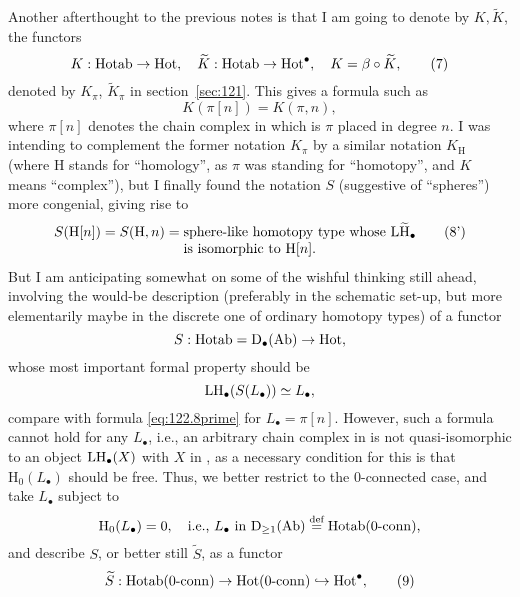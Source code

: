 Another afterthought to the previous notes is that I am going to
denote by $K, \widetilde K$, the functors
\begin{equation}
  \label{eq:122.7bis}
  K:\operatorname{Hotab}\to\operatorname{Hot}, \quad
  \widetilde K:\operatorname{Hotab}\to\operatorname{Hot}^\bullet, \quad
  K=\beta\circ\widetilde K,\tag{7}
\end{equation}
denoted by $K_\pi$, $\widetilde K_\pi$ in section~\ref{sec:121}. This
gives a formula such as
\begin{equation}
  \label{eq:122.8}
  K(\pi[n]) = K(\pi,n),\tag{8}
\end{equation}
where $\pi[n]$ denotes the chain complex in \Ab{} which is $\pi$
placed in degree $n$. I was intending to complement the former
notation $K_\pi$ by a similar notation $K_{\mathrm H}$ (where $\mathrm
H$ stands for ``homology'', as $\pi$ was standing for
``homotopy'', and $K$ means ``complex''), but I finally found the
notation $S$ (suggestive of ``spheres'') more congenial, giving rise
to
\begin{equation}
  \label{eq:122.8prime}
  S(\mathrm H[n]) = S(\mathrm H,n) =
  \begin{tabular}[t]{@{}l@{}}
    sphere-like homotopy type whose $\LtH_\bullet$ \\
    is isomorphic to $\mathrm H[n]$.
  \end{tabular}\tag{8'}
\end{equation}
But I am anticipating somewhat on some of the wishful thinking still
ahead, involving the would-be description (preferably in the schematic
set-up, but more elementarily maybe in the discrete one of ordinary
homotopy types) of a functor
\[S: \operatorname{Hotab} = {\mathrm{D}}_\bullet{\ensuremath{(\mathrm{Ab})}} \to \operatorname{Hot},\]
whose most important formal property should be
\[\operatorname{LH}_\bullet(S(L_\bullet)) \simeq L_\bullet,\]
compare with formula \eqref{eq:122.8prime} for
$L_\bullet=\pi[n]$. However, such a formula cannot hold for any $L_\bullet$,
i.e., an arbitrary chain complex in \Ab{} is not quasi-isomorphic to
an object $\operatorname{LH}_\bullet(X)$ with $X$ in \Hot, as a necessary condition
for this is that $\mathrm H_0(L_\bullet)$ should be free. Thus, we
better restrict to the $0$-connected case, and take $L_\bullet$
subject to
\[\mathrm H_0(L_\bullet) = 0,\quad\text{i.e., $L_\bullet$ in
    ${\mathrm{D}}_{\ge1}{(\mathrm{Ab})} \overset{\textup{def}}{=} \operatorname{Hotab}(0\textup{-}\mathrm{conn})$,}\]
and describe $S$, or better still $\widetilde S$, as a functor
\begin{equation}
  \label{eq:122.9}
  \widetilde S: \operatorname{Hotab}(0\textup{-}\mathrm{conn}) \to \operatorname{Hot}(0\textup{-}\mathrm{conn}) \hookrightarrow \operatorname{Hot}^\bullet,\tag{9}
\end{equation}
